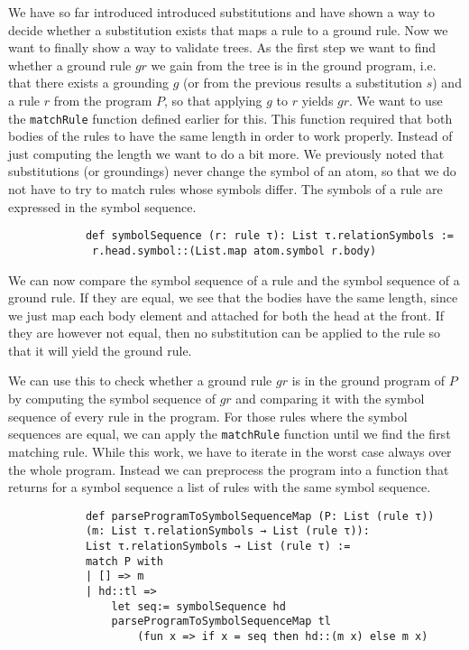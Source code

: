 \documentclass{article}
\begin{document}
        We have so far introduced introduced substitutions and have shown a way to decide whether a substitution exists that maps a rule to a ground rule. Now we want to finally show a way to validate trees. As the first step we want to find whether a ground rule $gr$ we gain from the tree is in the ground program, i.e. that there exists a grounding $g$ (or from the previous results a substitution $s$) and a rule $r$ from the program $P$, so that applying $g$ to $r$ yields $gr$. We want to use the \texttt{matchRule} function defined earlier for this. This function required that both bodies of the rules to have the same length in order to work properly. Instead of just computing the length we want to do a bit more. We previously noted that substitutions (or groundings) never change the symbol of an atom, so that we do not have to try to match rules whose symbols differ. The symbols of a rule are expressed in the symbol sequence.

        \begin{lstlisting}
            def symbolSequence (r: rule τ): List τ.relationSymbols := 
             r.head.symbol::(List.map atom.symbol r.body)

        \end{lstlisting}

        We can now compare the symbol sequence of a rule and the symbol sequence of a ground rule. If they are equal, we see that the bodies have the same length, since we just map each body element and attached for both the head at the front. If they are however not equal, then no substitution can be applied to the rule so that it will yield the ground rule.

        We can use this to check whether a ground rule $gr$ is in the ground program of $P$ by computing the symbol sequence of $gr$ and comparing it with the symbol sequence of every rule in the program. For those rules where the symbol sequences are equal, we can apply the \texttt{matchRule} function until we find the first matching rule. While this work, we have to iterate in the worst case always over the whole program. Instead we can preprocess the program into a function that returns for a symbol sequence a list of rules with the same symbol sequence.

        \begin{lstlisting}
            def parseProgramToSymbolSequenceMap (P: List (rule τ)) 
            (m: List τ.relationSymbols → List (rule τ)): 
            List τ.relationSymbols → List (rule τ) :=
            match P with
            | [] => m
            | hd::tl =>
                let seq:= symbolSequence hd
                parseProgramToSymbolSequenceMap tl 
                    (fun x => if x = seq then hd::(m x) else m x)
        \end{lstlisting}
\end{document}
